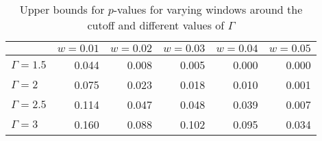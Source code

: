 \begin{table}

\caption{\label{tab:rd-locrand-bounds}Upper bounds for $p$-values for varying windows around the 
              cutoff and different values of $\Gamma$}
\centering
\begin{tabular}[t]{lrrrrr}
\toprule
  & $w = 0.01$ & $w = 0.02$ & $w = 0.03$ & $w = 0.04$ & $w = 0.05$\\
\midrule
$\Gamma = 1.5$ & 0.044 & 0.008 & 0.005 & 0.000 & 0.000\\
$\Gamma = 2$ & 0.075 & 0.023 & 0.018 & 0.010 & 0.001\\
$\Gamma = 2.5$ & 0.114 & 0.047 & 0.048 & 0.039 & 0.007\\
$\Gamma = 3$ & 0.160 & 0.088 & 0.102 & 0.095 & 0.034\\
\bottomrule
\end{tabular}
\end{table}
